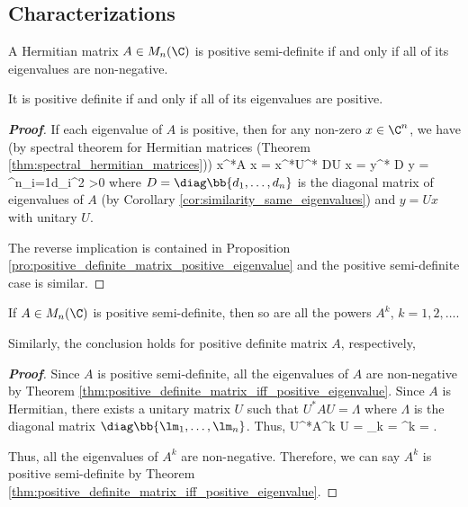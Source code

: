 \subsection{Characterizations}

\begin{theorem}\label{thm:positive_definite_matrix_iff_positive_eigenvalue}
A Hermitian matrix $A\in M_n(\C)$ is positive semi-definite if and only if all of its eigenvalues are non-negative. 

It is positive definite if and only if all of its eigenvalues are positive.
\end{theorem}

\begin{proof}[\bf Proof]
If each eigenvalue of $A$ is positive, then for any non-zero $x\in \C^n$, we have (by spectral theorem for Hermitian matrices (Theorem \ref{thm:spectral_hermitian_matrices}))
\be
x^*A x = x^*U^* DU x = y^* D y = \sum^n_{i=1}d_{i}^2 >0
\ee
where $D = \diag\bb{d_1,\dots,d_n}$ is the diagonal matrix of eigenvalues of $A$ (by Corollary \ref{cor:similarity_same_eigenvalues}) and $y = Ux$ with unitary $U$.

The reverse implication is contained in Proposition \ref{pro:positive_definite_matrix_positive_eigenvalue} and the positive semi-definite case is similar.
\end{proof}

\begin{corollary}\label{cor:power_of_positive_semidefinite_matrix}
If $A\in M_n(\C)$ is positive semi-definite, then so are all the powers $A^k$, $k=1,2,\dots$.

Similarly, the conclusion holds for positive definite matrix $A$, respectively,
\end{corollary}

\begin{proof}[\bf Proof]
Since $A$ is positive semi-definite, all the eigenvalues of $A$ are non-negative by Theorem \ref{thm:positive_definite_matrix_iff_positive_eigenvalue}. Since $A$ is Hermitian, there exists a unitary matrix $U$ such that $U^*AU = \Lambda$ where $\Lambda$ is the diagonal matrix $\diag\bb{\lm_1,\dots,\lm_n}$. Thus,
\be
U^*A^k U = _{k} = \Lambda^k = \diag{}.
\ee

Thus, all the eigenvalues of $A^k$ are non-negative. Therefore, we can say $A^k$ is positive semi-definite by Theorem \ref{thm:positive_definite_matrix_iff_positive_eigenvalue}.
\end{proof}



